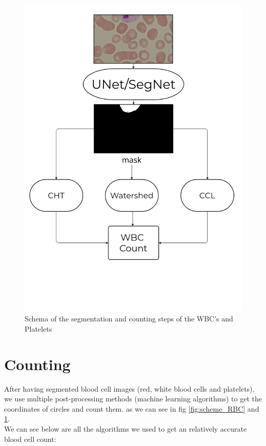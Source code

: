 \begin{figure}[H]
\centering
  \vspace{-0.1in}
    \centerline{\includegraphics[width = 7in]{../images/Diag_WBC_PLT_UNET_SegNet.png}}
    \caption{Schema of the segmentation and counting steps of the WBC's and Platelets}
    \label{fig:scheme_WBC_PLT}
\end{figure}

\section{Counting}
\vspace{0.2in}
\hspace{\parindent}
After having segmented blood cell images (red, white blood cells and platelets), we use multiple post-processing methods (machine learning algorithms) to get the coordinates of circles and count them. as we can see in fig \ref{fig:scheme_RBC} and \ref{fig:scheme_WBC_PLT}.\\
We can see below are all the algorithms we used to get an relatively accurate blood cell count:

